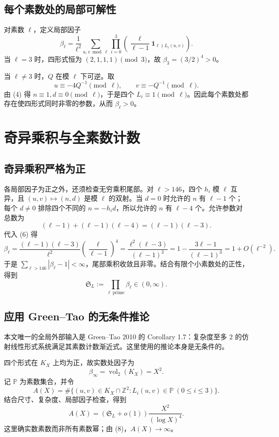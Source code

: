 \documentclass[11pt,a4paper]{ctexart}
\begin{document}
\subsection{每个素数处的局部可解性}
对素数 $\ell$，定义局部因子
\[
\beta_\ell=\frac1{\ell^2}\sum_{u,v\bmod\ell}
\prod_{i=0}^3\left(\frac{\ell}{\ell-1}\mathbf 1_{\ell\nmid L_i(u,v)}\right).\tag{6}
\]
当 $\ell=3$ 时，四形式恒为 $(2,1,1,1)\pmod3$，故 $\beta_3=(3/2)^4>0$。

当 $\ell\ne3$ 时，$Q$ 在模 $\ell$ 下可逆。取
\[
u\equiv-4Q^{-1}\pmod\ell,\qquad v\equiv-Q^{-1}\pmod\ell.
\]
由 (4) 得 $n\equiv1,d\equiv0\pmod\ell$，于是四个 $L_i\equiv1\pmod\ell$。因此每个素数处都存在使四形式同时非零的参数，从而 $\beta_\ell>0$。

\section{奇异乘积与全素数计数}
\subsection{奇异乘积严格为正}
各局部因子为正之外，还须检查无穷乘积尾部。对 $\ell>146$，四个 $h_i$ 模 $\ell$ 互异，且 $(u,v)\mapsto(n,d)$ 是模 $\ell$ 的双射。当 $d=0$ 时允许的 $n$ 有 $\ell-1$ 个；每个 $d\ne0$ 排除四个不同的 $n=-h_id$，所以允许的 $n$ 有 $\ell-4$ 个。允许参数对总数为
\[
(\ell-1)+(\ell-1)(\ell-4)=(\ell-1)(\ell-3).
\]
代入 (6) 得
\[
\beta_\ell
=\frac{(\ell-1)(\ell-3)}{\ell^2}\left(\frac\ell{\ell-1}\right)^4
=\frac{\ell^2(\ell-3)}{(\ell-1)^3}
=1-\frac{3\ell-1}{(\ell-1)^3}
=1+O(\ell^{-2}).\tag{7}
\]
于是 $\sum_{\ell>146}|\beta_\ell-1|<\infty$，尾部乘积收敛且非零。结合有限个小素数处的正性，得到
\[
\mathfrak S_L:=\prod_{\ell\ \mathrm{prime}}\beta_\ell\in(0,\infty).\tag{8}
\]

\subsection{应用 Green--Tao 的无条件推论}
本文唯一的全局外部输入是 Green--Tao 2010 的 Corollary 1.7：复杂度至多 $2$ 的仿射线性形式系统满足其素数计数渐近式。这里使用的推论本身是无条件的。

四个形式在 $K_X$ 上均为正，故实数处因子为
\[
\beta_\infty=\operatorname{vol}_2(K_X)=X^2.
\]
记 $\mathbb P$ 为素数集合，并令
\[
A(X)=\#\{(u,v)\in K_X\cap\mathbb Z^2:L_i(u,v)\in\mathbb P\ (0\le i\le3)\}.
\]
结合尺寸、复杂度、局部因子检查，得到
\[
A(X)=(\mathfrak S_L+o(1))\frac{X^2}{(\log X)^4}.\tag{9}
\]
这里确实数素数而非所有素数幂；由 (8)，$A(X)\to\infty$。
\end{document}
